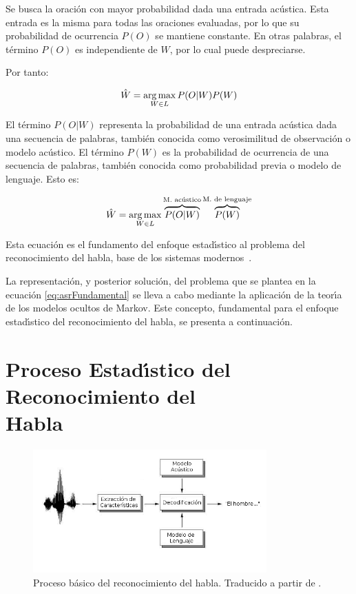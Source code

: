 Se busca la oraci\'on con mayor probabilidad dada una entrada ac\'ustica. Esta entrada es
la misma para todas las oraciones evaluadas, por lo que su probabilidad de ocurrencia $P(O)$ se mantiene constante.
En otras palabras, el t\'ermino $P(O)$ es independiente de $W$, por lo cual puede despreciarse. 

Por tanto:

\begin{align}
\hat{W} = \operatorname*{arg\,max}_{W \in L} P(O|W)P(W)
\end{align}

El t\'ermino $P(O|W)$ representa la probabilidad de una entrada ac\'ustica dada una secuencia de palabras, 
tambi\'en conocida como verosimilitud de observaci\'on o modelo ac\'ustico. El t\'ermino $P(W)$ es la
probabilidad  de ocurrencia de una secuencia de palabras, tambi\'en conocida como 
probabilidad previa o modelo de lenguaje. Esto es:

\begin{align}
\hat{W} = \operatorname*{arg\,max}_{W \in L} \overbrace{P(O|W)}^\text{M. ac\'ustico}\overbrace{P(W)}^\text{M. de lenguaje}
\label{eq:asrFundamental}
\end{align}

Esta ecuaci\'on es el fundamento del enfoque estad{\'\i}stico al problema del reconocimiento del habla, base de los
sistemas \mbox{modernos \cite{RabinerStatistical2006}}.

La representaci\'on, y posterior soluci\'on, del problema que se plantea en la 
ecuaci\'on \ref{eq:asrFundamental} se lleva a cabo mediante la aplicaci\'on de la teor{\'\i}a de
los modelos ocultos de Markov. Este concepto, fundamental
para el enfoque estad{\'\i}stico del reconocimiento del habla, se presenta a continuaci\'on.


\section[Proceso Estad{\'\i}stico del Reconocimiento del Habla]
{Proceso Estad{\'\i}stico del Reconocimiento del \\Habla}


\begin{figure}[H] 
\centering
\includegraphics[width=0.8\textwidth]{./graphics/proceso.png}
\caption{Proceso b\'asico del reconocimiento del habla. Traducido a partir de \cite{VerenichASR}.}
\label{figure:proceso}
\end{figure}

